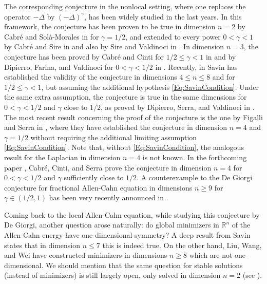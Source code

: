 \documentclass[twoside,leqno,symbols-for-thanks, draft]{rmi}
\numberwithin{equation}{section}
\theoremstyle{definition}
\newcommand{\con}[1]{\mathbb{#1}}
\newcommand{\R}{\con{R}} %
\newcommand{\s}{\gamma}
\newcommand{\fraclaplacian}{(-\Delta)^\s}
\begin{document}
The corresponding conjecture in the nonlocal setting, where one replaces the operator $-\Delta$ by $\fraclaplacian$, has been widely studied in the last years. In this framework, the conjecture has been proven to be true in dimension $n=2$ by Cabr\'e and Sol\`a-Morales in \cite{CabreSolaMorales} for $\s=1/2$, and extended to every power $0<\s<1$ by Cabré and Sire in \cite{CabreSireII} and also by Sire and Valdinoci in \cite{SireValdinoci}. In dimension $n=3$, the conjecture has been proved by Cabr\'e and Cinti for $1/2 \leq \s < 1$ in \cite{CabreCinti-EnergyHalfL, CabreCinti-SharpEnergy} and by Dipierro, Farina, and Valdinoci for $0<\s<1/2$ in \cite{DipierroFarinaValdinoci}. Recently, in \cite{Savin-Fractional,Savin-Fractional2} Savin has established the validity of the conjecture in dimensions $4\leq n \leq 8$ and for $1/2 \leq \s < 1$, but assuming the additional hypothesis \eqref{Eq:SavinCondition}. Under the same extra assumption, the conjecture is true in the same dimensions for $0<\s<1/2$ and $\s$ close to $1/2$, as proved by Dipierro, Serra, and Valdinoci in \cite{DipierroSerraValdinoci}. The most recent result concerning the proof of the conjecture is the one by Figalli and Serra in \cite{FigalliSerra}, where they have established the conjecture in dimension $n=4$ and $\s=1/2$ without requiring the additional limiting assumption \eqref{Eq:SavinCondition}. Note that, without \eqref{Eq:SavinCondition}, the analogous result for the Laplacian in dimension $n=4$ is not known. In the forthcoming paper \cite{CabreCintiSerra-Stable}, Cabr\'e, Cinti, and Serra prove the conjecture in dimension $n=4$ for $0<\s<1/2$ and $\s$ sufficiently close to $1/2$. A counterexample to the De Giorgi conjecture for fractional Allen-Cahn equation in dimensions $n \geq 9$ for $\s \in ( 1/2 , 1)$ has been very recently announced in \cite{ChanLiuWei}.

Coming back to the local Allen-Cahn equation, while studying this conjecture by De Giorgi, another question arose naturally: do global minimizers in $\R^n$ of the Allen-Cahn energy have one-dimensional symmetry? A deep result from Savin \cite{Savin-DeGiorgi} states that in dimension $n \leq 7$ this is indeed true. On the other hand, Liu, Wang, and Wei \cite{LiuWangWei} have constructed minimizers in dimensions $n\geq 8$ which are not one-dimensional. We should mention that the same question for stable solutions (instead of minimizers) is still largely open, only solved in dimension $n=2$ (see \cite{GhoussoubGui,BerestyckiCaffarelliNiremberg-Qualitative}).
\end{document}
